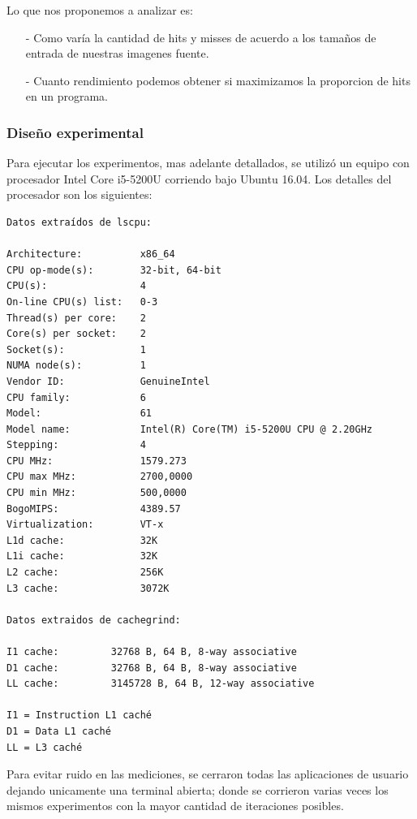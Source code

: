 \documentclass[a4paper]{article}
\newenvironment{codesnippet}{%
	\begin{Sbox}\begin{minipage}{\textwidth}\sffamily\small}%
	{\end{minipage}\end{Sbox}%
		\begin{center}%
		\vspace{-0.4cm}\colorbox{litegrey}{\TheSbox}\end{center}\vspace{0.3cm}}
\begin{document}
Lo que nos proponemos a analizar es:
\begin{itemize}
    \itemsep0em
    \item[-]
        Como varía la cantidad de hits y misses de acuerdo a los tamaños de entrada de nuestras imagenes fuente.
    \item[-]
        Cuanto rendimiento podemos obtener si maximizamos la proporcion de hits en un programa.
\end{itemize}

\subsubsection*{Diseño experimental}

Para ejecutar los experimentos, mas adelante detallados, se utilizó un equipo con procesador Intel Core i5-5200U corriendo bajo Ubuntu 16.04. Los detalles del procesador son los siguientes:

\begin{codesnippet}
\begin{verbatim}
Datos extraídos de lscpu:

Architecture:          x86_64
CPU op-mode(s):        32-bit, 64-bit
CPU(s):                4
On-line CPU(s) list:   0-3
Thread(s) per core:    2
Core(s) per socket:    2
Socket(s):             1
NUMA node(s):          1
Vendor ID:             GenuineIntel
CPU family:            6
Model:                 61
Model name:            Intel(R) Core(TM) i5-5200U CPU @ 2.20GHz
Stepping:              4
CPU MHz:               1579.273
CPU max MHz:           2700,0000
CPU min MHz:           500,0000
BogoMIPS:              4389.57
Virtualization:        VT-x
L1d cache:             32K
L1i cache:             32K
L2 cache:              256K
L3 cache:              3072K

Datos extraidos de cachegrind:

I1 cache:         32768 B, 64 B, 8-way associative
D1 cache:         32768 B, 64 B, 8-way associative
LL cache:         3145728 B, 64 B, 12-way associative

I1 = Instruction L1 caché
D1 = Data L1 caché
LL = L3 caché
\end{verbatim}
\end{codesnippet}

Para evitar ruido en las mediciones, se cerraron todas las aplicaciones de usuario dejando unicamente una terminal abierta; donde se corrieron varias veces los mismos experimentos con la mayor cantidad de iteraciones posibles.
\end{document}
